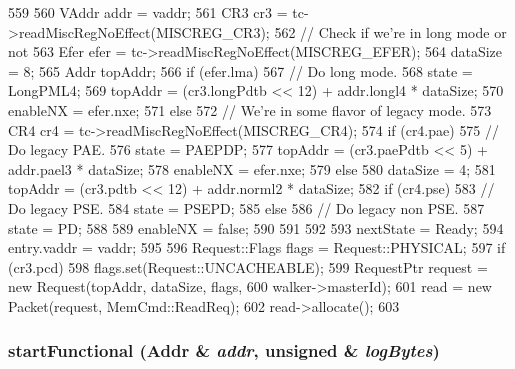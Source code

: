 \begin{DoxyCode}
559 {
560     VAddr addr = vaddr;
561     CR3 cr3 = tc->readMiscRegNoEffect(MISCREG_CR3);
562     // Check if we're in long mode or not
563     Efer efer = tc->readMiscRegNoEffect(MISCREG_EFER);
564     dataSize = 8;
565     Addr topAddr;
566     if (efer.lma) {
567         // Do long mode.
568         state = LongPML4;
569         topAddr = (cr3.longPdtb << 12) + addr.longl4 * dataSize;
570         enableNX = efer.nxe;
571     } else {
572         // We're in some flavor of legacy mode.
573         CR4 cr4 = tc->readMiscRegNoEffect(MISCREG_CR4);
574         if (cr4.pae) {
575             // Do legacy PAE.
576             state = PAEPDP;
577             topAddr = (cr3.paePdtb << 5) + addr.pael3 * dataSize;
578             enableNX = efer.nxe;
579         } else {
580             dataSize = 4;
581             topAddr = (cr3.pdtb << 12) + addr.norml2 * dataSize;
582             if (cr4.pse) {
583                 // Do legacy PSE.
584                 state = PSEPD;
585             } else {
586                 // Do legacy non PSE.
587                 state = PD;
588             }
589             enableNX = false;
590         }
591     }
592 
593     nextState = Ready;
594     entry.vaddr = vaddr;
595 
596     Request::Flags flags = Request::PHYSICAL;
597     if (cr3.pcd)
598         flags.set(Request::UNCACHEABLE);
599     RequestPtr request = new Request(topAddr, dataSize, flags,
600                                      walker->masterId);
601     read = new Packet(request, MemCmd::ReadReq);
602     read->allocate();
603 }
\end{DoxyCode}
\hypertarget{classX86ISA_1_1Walker_1_1WalkerState_ac1af47bc545fc273626009cb651d3b39}{
\subsubsection[{startFunctional}]{ startFunctional ({\bf Addr} \& {\em addr}, \/  unsigned \& {\em logBytes})}}
\label{classX86ISA_1_1Walker_1_1WalkerState_ac1af47bc545fc273626009cb651d3b39}



